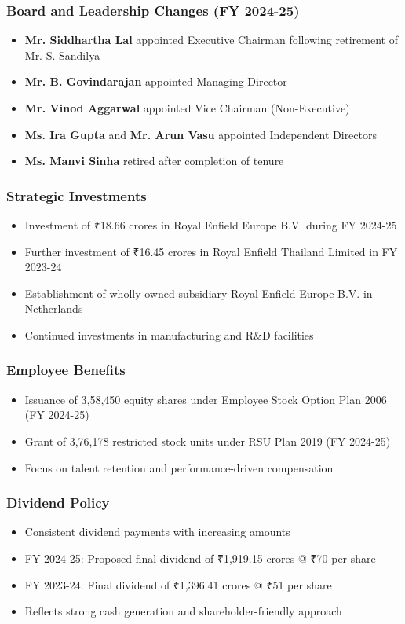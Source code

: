 \documentclass[8pt,a4paper]{article}
\begin{document}
\subsubsection{Board and Leadership Changes (FY 2024-25)}
\begin{itemize}
    \item \textbf{Mr. Siddhartha Lal} appointed Executive Chairman following retirement of Mr. S. Sandilya
    \item \textbf{Mr. B. Govindarajan} appointed Managing Director
    \item \textbf{Mr. Vinod Aggarwal} appointed Vice Chairman (Non-Executive)
    \item \textbf{Ms. Ira Gupta} and \textbf{Mr. Arun Vasu} appointed Independent Directors
    \item \textbf{Ms. Manvi Sinha} retired after completion of tenure
\end{itemize}

\subsubsection{Strategic Investments}
\begin{itemize}
    \item Investment of ₹18.66 crores in Royal Enfield Europe B.V. during FY 2024-25
    \item Further investment of ₹16.45 crores in Royal Enfield Thailand Limited in FY 2023-24
    \item Establishment of wholly owned subsidiary Royal Enfield Europe B.V. in Netherlands
    \item Continued investments in manufacturing and R\&D facilities
\end{itemize}

\subsubsection{Employee Benefits}
\begin{itemize}
    \item Issuance of 3,58,450 equity shares under Employee Stock Option Plan 2006 (FY 2024-25)
    \item Grant of 3,76,178 restricted stock units under RSU Plan 2019 (FY 2024-25)
    \item Focus on talent retention and performance-driven compensation
\end{itemize}

\subsubsection{Dividend Policy}
\begin{itemize}
    \item Consistent dividend payments with increasing amounts
    \item FY 2024-25: Proposed final dividend of ₹1,919.15 crores @ ₹70 per share
    \item FY 2023-24: Final dividend of ₹1,396.41 crores @ ₹51 per share
    \item Reflects strong cash generation and shareholder-friendly approach
\end{itemize}
\end{document}
